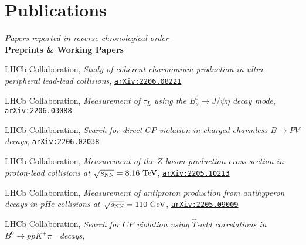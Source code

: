 \newcommand{\journal}[1]
  {\textbf{\large #1}\\\vspace{-5mm}}

\newcommand{\arxiv}[1]
  {\href{https://arxiv.org/abs/#1}{\texttt{arXiv:#1}}}


\section*{Publications}
\begin{cvcontent}
  \emph{Papers reported in reverse chronological order}\\[3mm]
  \journal{Preprints \& Working Papers}
  \begin{enumerate}[label={[\arabic*]}, leftmargin=1.5cm]
    \item LHCb Collaboration,
    \emph{Study of coherent charmonium production in ultra-peripheral lead-lead collisions},
    \arxiv{2206.08221}
    \item LHCb Collaboration,
    \emph{Measurement of $\tau_{L}$ using the $B_{s}^{0} \to J/\psi \eta$ decay mode},
    \arxiv{2206.03088}
    \item LHCb Collaboration,
    \emph{Search for direct $CP$ violation in charged charmless $B \to PV$ decays},
    \arxiv{2206.02038}
    \item LHCb Collaboration,
    \emph{Measurement of the $Z$ boson production cross-section in proton-lead collisions at $\sqrt{s_{\rm{NN}}}=8.16~\rm{TeV}$},
    \arxiv{2205.10213}
    \item LHCb Collaboration,
    \emph{Measurement of antiproton production from antihyperon decays in pHe collisions at $\sqrt{s_{\rm{NN}}}=110~\rm{GeV}$},
    \arxiv{2205.09009}
    \item LHCb Collaboration,
    \emph{Search for $CP$ violation using $\hat{T}$-odd correlations in $B^{0} \to p \bar p K^{+} \pi^{-}$ decays},

\end{enumerate}
\end{cvcontent}
